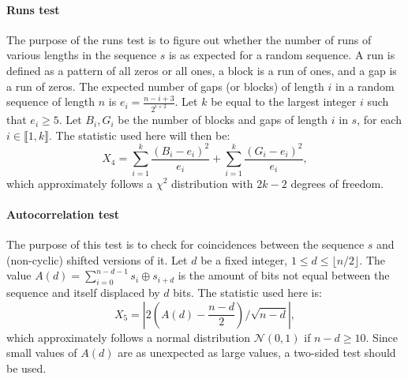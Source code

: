 \documentclass[journal]{IEEEtran}
\begin{document}
\paragraph{Runs test}
The purpose of the runs test is to figure out whether the number of runs of various lengths in the sequence $s$ is as expected for a random sequence. A run is defined as a pattern of all zeros or all ones, a block is a run of ones, and a gap is a run of zeros. The expected number of gaps (or blocks) of length $i$ in a random sequence of length $n$ is $e_i = \frac{n-i+3}{2^{i+2}}$. Let $k$ be equal to the largest integer $i$ such that $e_i \geqslant 5$. Let
$B_i , G_i$ be the number of blocks and gaps of length $i$ in $s$, for each $i \in \llbracket 1, k\rrbracket$. The statistic used here will then be:
\begin{equation*}
\displaystyle{X_4=\sum^k_{i=1}\frac{(B_i-e_i)^2}{e_i}+\sum^k_{i=1}\frac{(G_i-e_i)^2}{e_i}},
\end{equation*}
\noindent which approximately follows a $\chi^2$ distribution with $2k - 2$ degrees of freedom.


\paragraph{Autocorrelation test}

The purpose of this test is to check for coincidences between the sequence $s$ and (non-cyclic) shifted versions of it. Let $d$ be a fixed integer, $ 1 \leqslant d \leqslant \lfloor n/2 \rfloor$. The value $A(d) = \sum_{i=0}^{n-d-1} s_i\oplus s_{i+d}$ is the amount of bits not equal between the sequence and itself displaced by $d$ bits. The statistic used here is:\newline
\begin{equation*}
X_5=|2(A(d)-\frac{n-d}{2})/\sqrt{n-d}|,
\end{equation*}
\noindent which approximately follows a normal distribution $\mathcal{N}(0, 1)$ if $n-d \geqslant 10$. Since small values of $A(d)$ are as unexpected as large values, a two-sided test should be used.
\end{document}
